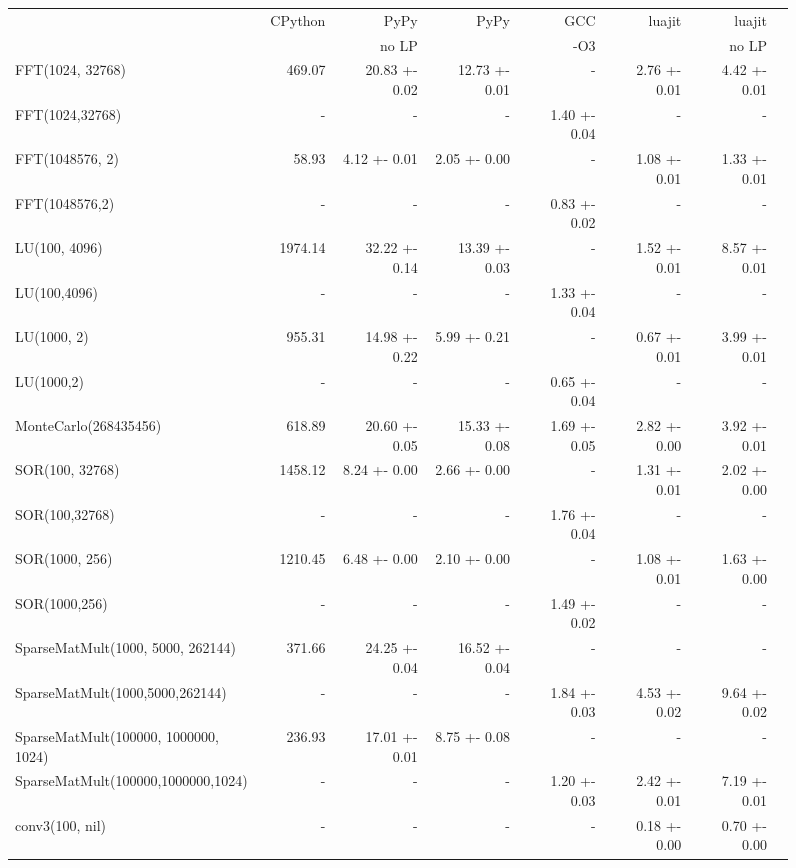 \documentclass[preprint]{sigplanconf}
\begin{document}
\begin{figure*}
\begin{center}
{\smaller
\begin{tabular}{|l|r|r|r|r|r|r|r|}
\hline
 & CPython & PyPy  & PyPy & GCC & luajit & luajit \\
 &        & no LP &       & -O3 &        & no LP \\
FFT(1024, 32768) & 469.07 & 20.83 +- 0.02 & 12.73 +- 0.01 & - & 2.76 +- 0.01 & 4.42 +- 0.01\\
\hline
FFT(1024,32768) & - & - & - & 1.40 +- 0.04 & - & -\\
\hline
FFT(1048576, 2) & 58.93 & 4.12 +- 0.01 & 2.05 +- 0.00 & - & 1.08 +- 0.01 & 1.33 +- 0.01\\
\hline
FFT(1048576,2) & - & - & - & 0.83 +- 0.02 & - & -\\
\hline
LU(100, 4096) & 1974.14 & 32.22 +- 0.14 & 13.39 +- 0.03 & - & 1.52 +- 0.01 & 8.57 +- 0.01\\
\hline
LU(100,4096) & - & - & - & 1.33 +- 0.04 & - & -\\
\hline
LU(1000, 2) & 955.31 & 14.98 +- 0.22 & 5.99 +- 0.21 & - & 0.67 +- 0.01 & 3.99 +- 0.01\\
\hline
LU(1000,2) & - & - & - & 0.65 +- 0.04 & - & -\\
\hline
MonteCarlo(268435456) & 618.89 & 20.60 +- 0.05 & 15.33 +- 0.08 & 1.69 +- 0.05 & 2.82 +- 0.00 & 3.92 +- 0.01\\
\hline
SOR(100, 32768) & 1458.12 & 8.24 +- 0.00 & 2.66 +- 0.00 & - & 1.31 +- 0.01 & 2.02 +- 0.00\\
\hline
SOR(100,32768) & - & - & - & 1.76 +- 0.04 & - & -\\
\hline
SOR(1000, 256) & 1210.45 & 6.48 +- 0.00 & 2.10 +- 0.00 & - & 1.08 +- 0.01 & 1.63 +- 0.00\\
\hline
SOR(1000,256) & - & - & - & 1.49 +- 0.02 & - & -\\
\hline
SparseMatMult(1000, 5000, 262144) & 371.66 & 24.25 +- 0.04 & 16.52 +- 0.04 & - & - & -\\
\hline
SparseMatMult(1000,5000,262144) & - & - & - & 1.84 +- 0.03 & 4.53 +- 0.02 & 9.64 +- 0.02\\
\hline
SparseMatMult(100000, 1000000, 1024) & 236.93 & 17.01 +- 0.01 & 8.75 +- 0.08 & - & - & -\\
\hline
SparseMatMult(100000,1000000,1024) & - & - & - & 1.20 +- 0.03 & 2.42 +- 0.01 & 7.19 +- 0.01\\
\hline
conv3(100, nil) & - & - & - & - & 0.18 +- 0.00 & 0.70 +- 0.00\\

\end{tabular}}
\end{center}
\end{figure*}
\end{document}
